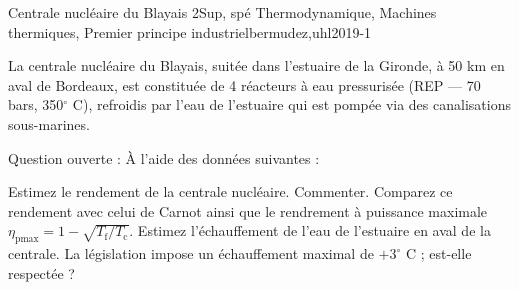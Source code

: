 \begin{exercise}{Centrale nucléaire du Blayais  }{2}{Sup, spé}
{Thermodynamique, Machines thermiques, Premier principe industriel}{bermudez,uhl2019-1}

La centrale nucléaire du Blayais, suitée dans l'estuaire de la Gironde, à 50 km en aval de Bordeaux, est constituée de 4 réacteurs à eau pressurisée (REP --- 70 bars, 350$^\circ$ C), refroidis par l'eau de l'estuaire qui est pompée via des canalisations sous-marines.

\textsf{Question ouverte : } \`A l'aide des données suivantes :
\begin{questions}
    \question Estimez le rendement de la centrale nucléaire. Commenter.
    \question Comparez ce rendement avec celui de Carnot ainsi que le rendrement à puissance maximale $\eta_\text{pmax} = 1 - \sqrt{T_\text{f}/T_\text{c}}$.
    \question Estimez l'échauffement de l'eau de l'estuaire en aval de la centrale. La législation impose un échauffement maximal de $+3^\circ$ C ; est-elle respectée ?
\end{questions}


\end{exercise}
